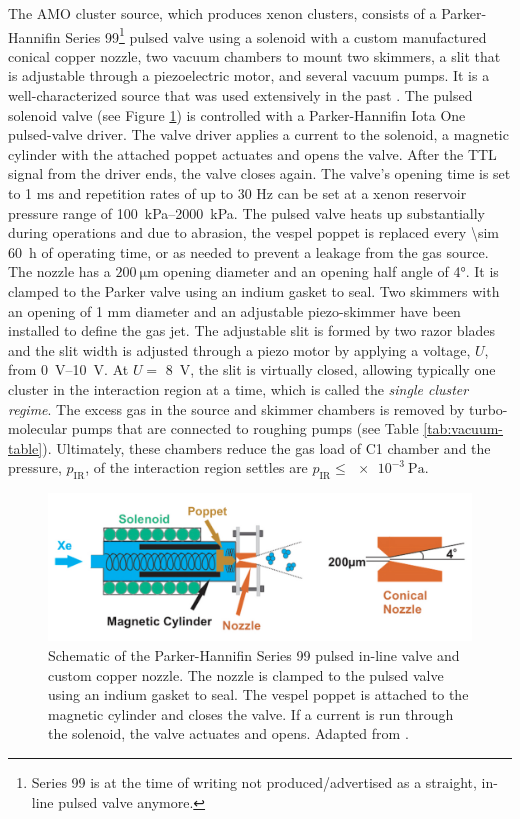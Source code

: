 The AMO cluster source, which produces xenon clusters, consists of a Parker-Hannifin Series 99\footnote{Series 99 is at the time of writing not produced/advertised as a straight, in-line pulsed valve anymore.} pulsed valve using a solenoid with a custom manufactured conical copper nozzle, two vacuum chambers to mount two skimmers, a slit that is adjustable through a piezoelectric motor, and several vacuum pumps. It is a well-characterized source that was used extensively in the past \citep{Ferguson-2016-SciAdv,Ferguson-2015-JSR,Gorkhover-2012-PRL,Gorkhover-2016-NatPho,Rupp-2014-JCP}. The pulsed solenoid valve (see Figure \ref{fig:parker-valve}) is controlled with a Parker-Hannifin Iota One pulsed-valve driver. The valve driver applies a current to the solenoid, a magnetic cylinder with the attached poppet actuates and opens the valve. After the TTL signal from the driver ends, the valve closes again. The valve's opening time is set to 1 ms and repetition rates of up to $30$ Hz can be set at a xenon reservoir pressure range of \SIrange{100}{2000}{\kilo\pascal}. The pulsed valve heats up substantially during operations and due to abrasion, the vespel poppet is replaced every \SI{\sim 60}{\hour} of operating time, or as needed to prevent a leakage from the gas source. The nozzle has a $\SI{200}{\micro\meter}$ opening diameter and an opening half angle of \ang{4}. It is clamped to the Parker valve using an indium gasket to seal. Two skimmers with an opening of 1 mm diameter and an adjustable piezo-skimmer have been installed to define the gas jet. The adjustable slit is formed by two razor blades and the slit width is adjusted through a piezo motor by applying a voltage, $U$, from \SIrange{0}{10}{\volt}. At $U=$ \SI{8}{\volt}, the slit is virtually closed, allowing typically one cluster in the interaction region at a time, which is called the \textit{single cluster regime}. The excess gas in the source and skimmer chambers is removed by turbo-molecular pumps that are connected to roughing pumps (see Table \ref{tab:vacuum-table}). Ultimately, these chambers reduce the gas load of C1 chamber and the pressure, $p_{\text{IR}}$, of the interaction region settles are $p_{\text{IR}}\leq \SI{e-3}{\pascal}$.\\[1\baselineskip]
\begin{figure}
	\centering
		\includegraphics[width=1.00\textwidth]{images/parker-valve.jpg}
	\caption[Schematic of the Parker-Hannifin Series 99 valve.]{Schematic of the Parker-Hannifin Series 99 pulsed in-line valve and custom copper nozzle. The nozzle is clamped to the pulsed valve using an indium gasket to seal. The vespel poppet is attached to the magnetic cylinder and closes the valve. If a current is run through the solenoid, the valve actuates and opens. Adapted from \cite{Ferguson-2016-PhD}.}
	\label{fig:parker-valve}
\end{figure}
